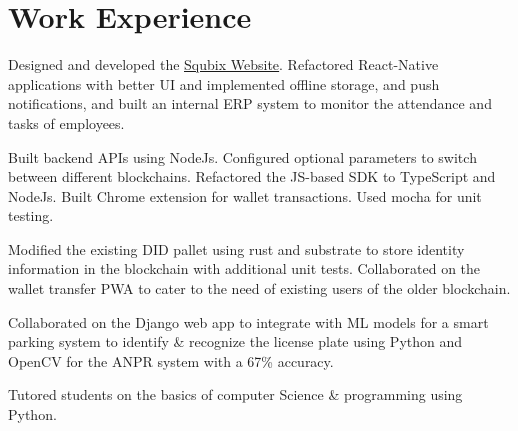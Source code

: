 \documentclass[]{assets/deedy-resume-openfont}
\begin{document}
  \section{Work Experience}
  \hfill {}
      \begin{tightemize}
       \item Designed and developed the {\href{https://squbix.com/}{ \underline{Squbix Website}}}. Refactored React-Native applications with better UI and implemented offline storage, and push notifications, and built an internal ERP system to monitor the attendance and tasks of employees.
       \item Built backend APIs using NodeJs. Configured optional parameters to switch between different blockchains. Refactored the JS-based SDK to TypeScript and NodeJs. Built Chrome extension for wallet transactions. Used mocha for unit testing.
       \item Modified the existing DID pallet using rust and substrate to store identity information in the blockchain with additional unit tests. Collaborated on the wallet transfer PWA to cater to the need of existing users of the older blockchain.
      \end{tightemize}
      \sectionsep
  \hfill {}
      \begin{tightemize}
    \item Collaborated on the Django web app to integrate with ML models for a smart parking system to identify \& recognize the license plate using Python and OpenCV for the ANPR system with a 67\% accuracy.
\end{tightemize}
      \sectionsep
      \hfill {}
      \begin{tightemize}
    \item Tutored students on the basics of computer Science \& programming using Python.
    \end{tightemize}
      \sectionsep
%
%
\end{document}
